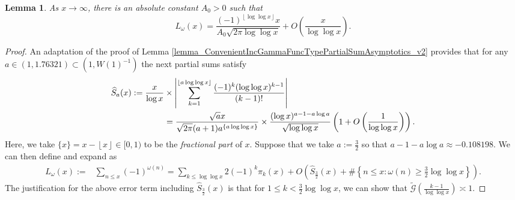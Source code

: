 \documentclass[11pt,reqno,a4letter]{article}
\newcommand{\hlocalref}[1]{\hyperref[#1]{\ref{#1}}}
\numberwithin{equation}{section}
\numberwithin{figure}{section}
\numberwithin{table}{section}
\newcommand{\floor}[1]{\left\lfloor #1 \right\rfloor}
\theoremstyle{plain}
\newtheorem{lemma}[theorem]{Lemma}
\numberwithin{theorem}{section}
\theoremstyle{definition}
\begin{document}
\begin{lemma} 
\label{cor_AsymptoticsForSignedSumsOfomegan_v1}
As $x \rightarrow \infty$, there is an absolute constant $A_0 > 0$ such that 
\[
L_{\omega}(x) = 
     \frac{(-1)^{\floor{\log\log x}} x}{A_0 \sqrt{2\pi \log\log x}} + 
     O\left(\frac{x}{\log\log x}\right). 
\]
\end{lemma}
\begin{proof}
An adaptation of the proof of Lemma \hlocalref{lemma_ConvenientIncGammaFuncTypePartialSumAsymptotics_v2} 
provides that for any $a \in (1, 1.76321) \subset \left(1, W(1)^{-1}\right)$ the 
next partial sums satisfy 
\begin{align}
\notag 
\widehat{S}_a(x) := 
     \frac{x}{\log x} & \times \left\lvert \sum_{k=1}^{\floor{a\log\log x}} \frac{(-1)^{k} (\log\log x)^{k-1}}{(k-1)!} 
     \right\rvert \\ 
\label{eqn_ConvenientIncGammaFuncTypePartialSumAsymptotics_va3} 
     & = \frac{\sqrt{a} x}{\sqrt{2\pi}(a+1) a^{\{a\log\log x\}}} 
     \times \frac{(\log x)^{a-1-a\log a}}{\sqrt{\log\log x}} 
     \left(1 + O\left(\frac{1}{\log\log x}\right)\right). 
\end{align}
Here, we take $\{x\} = x - \floor{x} \in [0, 1)$ to be the \emph{fractional part} of $x$. 
Suppose that we take $a := \frac{3}{2}$ so that $a-1-a\log a \approx -0.108198$. 
We can then define and expand as 
\begin{align*}
L_{\omega}(x) := & \sum_{n \leq x} (-1)^{\omega(n)} = 
     \sum_{k \leq \log\log x} 2 (-1)^{k} \pi_k(x) + 
     O\left(\widehat{S}_{\frac{3}{2}}(x) + 
     \#\left\{n \leq x: \omega(n) \geq \frac{3}{2}\log\log x\right\}\right). 
\end{align*} 
The justification for the above error term including $\widehat{S}_{\frac{3}{2}}(x)$ is that for 
$1 \leq k < \frac{3}{2}\log\log x$, we can show that 
$\widetilde{\mathcal{G}}\left(\frac{k-1}{\log\log x}\right) \asymp 1$. 

\end{proof}
\end{document}
